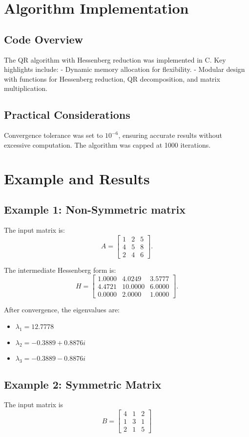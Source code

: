 \documentclass[12pt,a4paper]{article}
\begin{document}
\section{Algorithm Implementation}
\subsection{Code Overview}
The QR algorithm with Hessenberg reduction was implemented in C. Key highlights include:
- Dynamic memory allocation for flexibility.
- Modular design with functions for Hessenberg reduction, QR decomposition, and matrix multiplication.

\subsection{Practical Considerations}
Convergence tolerance was set to \( 10^{-6} \), ensuring accurate results without excessive computation. The algorithm was capped at 1000 iterations.

\section{Example and Results}
\subsection{Example 1: Non-Symmetric matrix}
The input matrix is:
\[
A = \begin{bmatrix}
1 & 2 & 5 \\
4 & 5 & 8 \\
2 & 4 & 6
\end{bmatrix}.
\]

The intermediate Hessenberg form is:
\[
H = \begin{bmatrix}
1.0000 & 4.0249 & 3.5777 \\
4.4721 & 10.0000 & 6.0000 \\
0.0000 & 2.0000 & 1.0000
\end{bmatrix}.
\]

After convergence, the eigenvalues are:
\begin{itemize}
    \item \( \lambda_1 = 12.7778 \)
    \item \( \lambda_2 = -0.3889 + 0.8876i \)
    \item \( \lambda_3 = -0.3889 - 0.8876i \)
\end{itemize}
\subsection{Example 2: Symmetric Matrix}
The input matrix is
\[
B = \begin{bmatrix}
4 & 1 & 2 \\
1 & 3 & 1 \\
2 & 1 & 5
\end{bmatrix}
\]
\end{document}

